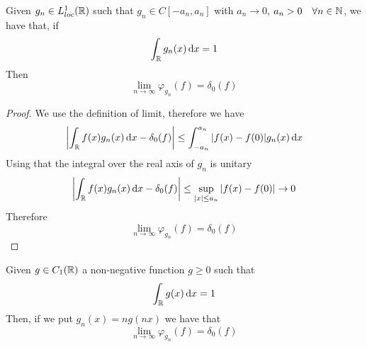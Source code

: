 \documentclass[../complete.tex]{subfiles}
\begin{document}
\begin{thm}
	Given $g_n\in L^1_{loc}(\mathbb{R})$ such that $g_n\in C[-a_n,a_n]$ with $a_n\to0$, $a_n>0\quad\forall n\in\mathbb{N}$, we have that, if
	\begin{equation*}
		\int_{\mathbb{R}}^{}g_n(x)\operatorname{d\!} x=1
	\end{equation*}
	Then
	\begin{equation*}
		\lim_{n\to\infty}\varphi_{g_n}(f)=\delta_0(f)
	\end{equation*}
\end{thm}
\begin{proof}
	We use the definition of limit, therefore we have
	\begin{equation*}
		\abs{\int_{\mathbb{R}}^{}f(x)g_n(x)\operatorname{d\!} x-\delta_0(f)}\le\int_{-a_n}^{a_n}\abs{f(x)-f(0)}g_n(x)\operatorname{d\!} x
	\end{equation*}
	Using that the integral over the real axis of $g_n$ is unitary
	\begin{equation*}
		\abs{\int_{\mathbb{R}} f(x)g_n(x)\operatorname{d\!} x-\delta_0(f)}\le\sup_{\abs{x}\le a_n}\abs{f(x)-f(0)}\to0
	\end{equation*}
	Therefore
	\begin{equation*}
		\lim_{n\to\infty}\varphi_{g_n}(f)=\delta_0(f)
	\end{equation*}
\end{proof}
\begin{cor}
	Given $g\in C_1(\mathbb{R})$ a non-negative function $g\ge0$ such that
	\begin{equation*}
		\int_{\mathbb{R}}^{}g(x)\operatorname{d\!} x=1
	\end{equation*}
	Then, if we put $g_n(x)=ng(nx)$ we have that
	\begin{equation*}
		\lim_{n\to\infty}\varphi_{g_n}(f)=\delta_0(f)
	\end{equation*}
\end{cor}
\end{document}
